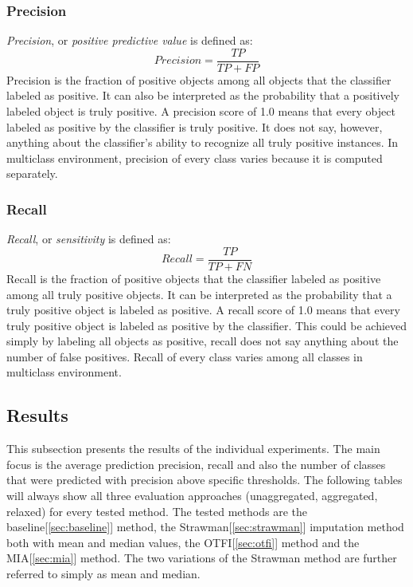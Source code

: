 \documentclass[11pt]{article}
\begin{document}
      \subsubsection{Precision}
        {\it Precision}, or {\it positive predictive value}\cite{confusion} is defined as:
        \begin{equation}
          Precision = \frac{TP}{TP + FP}
        \end{equation}
        Precision is the fraction of positive objects among all objects that the classifier labeled as positive. It can also be interpreted as the probability that a positively labeled object is truly positive. A precision score of 1.0 means that every object labeled as positive by the classifier is truly positive. It does not say, however, anything about the classifier's ability to recognize all truly positive instances. In multiclass environment, precision of every class varies because it is computed separately.
      \subsubsection{Recall}
        {\it Recall}, or {\it sensitivity}\cite{confusion} is defined as:
        \begin{equation}
          Recall = \frac{TP}{TP + FN}
        \end{equation}
        Recall is the fraction of positive objects that the classifier labeled as positive among all truly positive objects. It can be interpreted as the probability that a truly positive object is labeled as positive. A recall score of 1.0 means that every truly positive object is labeled as positive by the classifier. This could be achieved simply by labeling all objects as positive, recall does not say anything about the number of false positives. Recall of every class varies among all classes in multiclass environment.
    \subsection{Results}
      This subsection presents the results of the individual experiments. The main focus is the average prediction precision, recall and also the number of classes that were predicted with precision above specific thresholds. The following tables will always show all three evaluation approaches (unaggregated, aggregated, relaxed) for every tested method. The tested methods are the baseline[\ref{sec:baseline}] method, the Strawman[\ref{sec:strawman}] imputation method both with mean and median values, the OTFI[\ref{sec:otfi}] method and the MIA[\ref{sec:mia}] method. The two variations of the Strawman method are further referred to simply as mean and median.
\end{document}
